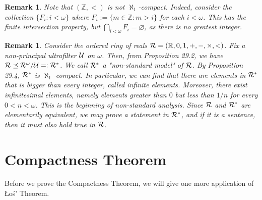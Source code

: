 \documentclass[10pt]{article}
\newcommand{\R}{\mathbb{R}}
\newcommand{\Z}{\mathbb{Z}}
\theoremstyle{newstyle}
\newtheorem{remark}[thm]{Remark}
\begin{document}
\begin{remark}
Note that $(\Z, <)$ is not $\aleph_1$-compact. Indeed, consider the collection 
$\{F_i : i < \omega\}$ where $F_i := \{m \in \Z : m > i\}$ for each $i < \omega$. This 
has the finite intersection property, but $\bigcap_{i < \omega} F_i = \varnothing$, 
as there is no greatest integer. 
\end{remark}

\begin{remark}
Consider the ordered ring of reals ${\cal R} 
= (\R, 0, 1, +, -, \times, <)$. Fix a non-principal ultrafilter ${\cal U}$ on $\omega$. 
Then, from Proposition 29.2, we have ${\cal R} \preceq {\cal R}^{\omega} / {\cal U} 
=: {\cal R}^*$. We call ${\cal R}^*$ a "non-standard model" of ${\cal R}$. 
By Proposition 29.4, ${\cal R}^*$ is $\aleph_1$-compact. In particular, we can find that
there are elements in ${\cal R}^*$ that is bigger than every integer, called infinite elements. 
Moreover, there exist infinitesimal elements, namely elements greater than $0$ 
but less than $1/n$ for every $0 < n < \omega$. This is the beginning of non-standard analysis.
Since ${\cal R}$ and ${\cal R}^*$ are elementarily equivalent, we may prove 
a statement in ${\cal R}^*$, and if it is a sentence, then it must also hold true in ${\cal R}$. 
\end{remark}

\newpage 
\section{Compactness Theorem}

Before we prove the Compactness Theorem, we will give one more application of 
\L{}o\'s' Theorem. 
\end{document}
